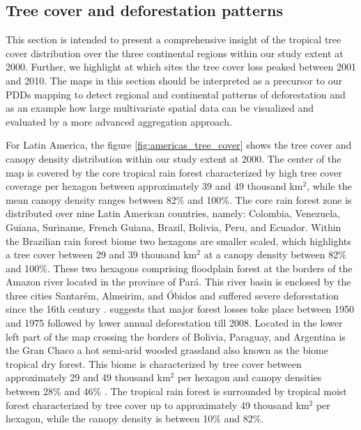 		\subsection{Tree cover and deforestation patterns}
		\label{subsec:results_tree_cover_and_deforestation}
			This section is intended to present a comprehensive insight of the tropical tree cover distribution over the three continental regions within our study extent at 2000. Further, we highlight at which sites the tree cover loss peaked between 2001 and 2010. The maps in this section should be interpreted as a precursor to our \acp{PDD} mapping to detect regional and continental patterns of deforestation and as an example how large multivariate spatial data can be visualized and evaluated by a more advanced aggregation approach.

			For Latin America, the figure \ref{fig:americas_tree_cover} shows the tree cover and canopy density distribution within our study extent at 2000. The center of the map is covered by the core tropical rain forest characterized by high tree cover coverage per hexagon between approximately 39 and 49 thousand km$^2$, while the mean canopy density ranges between 82\% and 100\%. The core rain forest zone is distributed over nine Latin American countries, namely: Colombia, Venezuela, Guiana, Suriname, French Guiana, Brazil, Bolivia, Peru, and Ecuador. Within the Brazilian rain forest biome two hexagons are smaller scaled, which highlights a tree cover between 29 and 39 thousand km$^2$ at a canopy density between 82\% and 100\%. These two hexagons comprising floodplain forest at the borders of the Amazon river located in the province of Pará. This river basin is enclosed by the three cities Santarém, Almeirim, and Óbidos and suffered severe deforestation since the 16th century \citep{Reno2011}. \citeauthor{Reno2011} suggests that major forest losses toke place between 1950 and 1975 followed by lower annual deforestation till 2008. Located in the lower left part of the map crossing the borders of Bolivia, Paraguay, and Argentina is the Gran Chaco a hot semi-arid wooded grassland also known as the biome tropical dry forest. This biome is characterized by tree cover between approximately 29 and 49 thousand km$^2$ per hexagon and canopy densities between 28\% and 46\% \citep{Caldas2013}. The tropical rain forest is surrounded by tropical moist forest characterized by tree cover up to approximately 49 thousand km$^2$ per hexagon, while the canopy density is between 10\% and 82\%.
